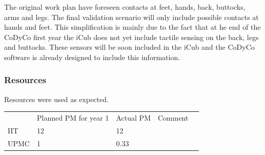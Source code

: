\documentclass[12pt,a4paper,twoside]{article}
\begin{document}
The original work plan have foreseen contacts at feet, hands, back, buttocks, arms and legs. The final validation scenario will only include possible contacts at hands and feet. This simplification is mainly due to the fact that at he end of the CoDyCo first year the iCub does not yet include tactile sensing on the back, legs and buttocks. These sensors will be soon included in the iCub and the CoDyCo software is already designed to include this information. 


\subsubsection{Resources}

Resources were used as expected.

\begin{center}
\begin{tabular}{|l|l|l|l|l}
\cline{1-4}
 & Planned PM for year 1 & Actual PM & Comment & \\ \cline{1-4}
IIT & 12 & 12 &  &  \\ \cline{1-4}
UPMC & 1 & 0.33 &  &  \\ \cline{1-4}
\end{tabular}
\end{center}
\end{document}

